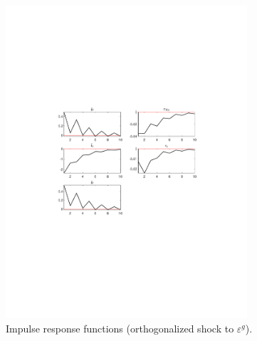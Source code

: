 \begin{figure}[H]
\centering 
\includegraphics[width=0.80\textwidth]{fiscal/graphs/fiscal_IRF_eps_g}
\caption{Impulse response functions (orthogonalized shock to ${\varepsilon^{g}}$).}
\label{Fig:IRF:eps_g}
\end{figure}
 
 
